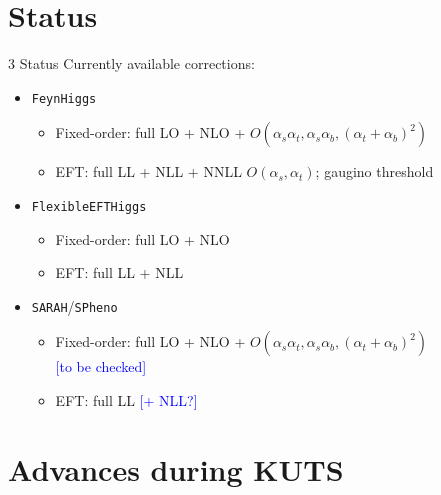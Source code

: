 \documentclass[hyperref={pdfpagelabels=false},ngerman]{beamer}
\newcommand{\feft}{\texttt{FlexibleEFTHiggs}\xspace}
\newcommand{\FH}{\texttt{FeynHiggs}\xspace}
\newcommand{\SPheno}{\texttt{SPheno}\xspace}
\newcommand{\SARAH}{\texttt{SARAH}\xspace}
\newcommand{\at}{\alpha_t}
\newcommand{\ab}{\alpha_b}
\newcommand{\as}{\alpha_s}
\newcommand{\avnote}[1]{\textcolor{blue}{[#1]}}
\begin{document}
\section{Status}

\begin{frame}{3 Status}
  Currently available corrections:\\[1em]
  \begin{itemize}
  \item \FH
    \begin{itemize}
    \item Fixed-order: full LO + NLO + $O(\as\at,\as\ab,(\at + \ab)^2)$
    \item EFT: full LL + NLL + NNLL $O(\as,\at)$; gaugino threshold
    \end{itemize}
  \item \feft
    \begin{itemize}
    \item Fixed-order: full LO + NLO
    \item EFT: full LL + NLL
    \end{itemize}
  \item \SARAH/\SPheno
    \begin{itemize}
    \item Fixed-order: full LO + NLO + $O(\as \at, \as \ab, (\at + \ab)^2)$
      \\\avnote{to be checked}
    \item EFT: full LL \avnote{+ NLL?}
    \end{itemize}
  \end{itemize}
\end{frame}

\section{Advances during KUTS}
\end{document}
